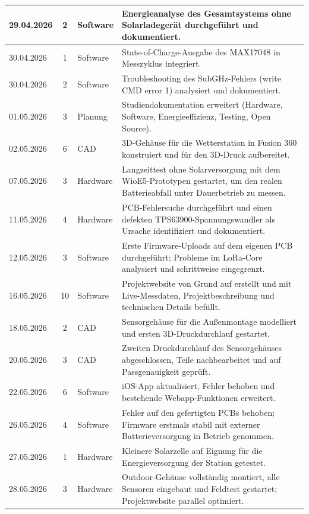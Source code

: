 \begin{longtable}{|l|c|l|p{7.5cm}|}
\hline
29.04.2026 & 2 & Software & Energieanalyse des Gesamtsystems ohne Solarladegerät durchgeführt und dokumentiert. \\
\hline
30.04.2026 & 1 & Software & State-of-Charge-Ausgabe des MAX17048 in Messzyklus integriert. \\
\hline
30.04.2026 & 2 & Software & Troubleshooting des SubGHz-Fehlers (write CMD error 1) analysiert und dokumentiert. \\
\hline
01.05.2026 & 3 & Planung & Studiendokumentation erweitert (Hardware, Software, Energieeffizienz, Testing, Open Source). \\
\hline
02.05.2026 & 6 & CAD & 3D-Gehäuse für die Wetterstation in Fusion 360 konstruiert und für den 3D-Druck aufbereitet. \\
\hline
07.05.2026 & 3 & Hardware & Langzeittest ohne Solarversorgung mit dem WioE5-Prototypen gestartet, um den realen Batterieabfall unter Dauerbetrieb zu messen. \\
\hline
11.05.2026 & 4 & Hardware & PCB-Fehlersuche durchgeführt und einen defekten TPS63900-Spannungswandler als Ursache identifiziert und dokumentiert. \\
\hline
12.05.2026 & 3 & Software & Erste Firmware-Uploads auf dem eigenen PCB durchgeführt; Probleme im LoRa-Core analysiert und schrittweise eingegrenzt. \\
\hline
16.05.2026 & 10 & Software & Projektwebsite von Grund auf erstellt und mit Live-Messdaten, Projektbeschreibung und technischen Details befüllt. \\
\hline
18.05.2026 & 2 & CAD & Sensorgehäuse für die Außenmontage modelliert und ersten 3D-Druckdurchlauf gestartet. \\
\hline
20.05.2026 & 3 & CAD & Zweiten Druckdurchlauf des Sensorgehäuses abgeschlossen, Teile nachbearbeitet und auf Passgenauigkeit geprüft. \\
\hline
22.05.2026 & 6 & Software & iOS-App aktualisiert, Fehler behoben und bestehende Webapp-Funktionen erweitert. \\
\hline
26.05.2026 & 4 & Software & Fehler auf den gefertigten PCBs behoben; Firmware erstmals stabil mit externer Batterieversorgung in Betrieb genommen. \\
\hline
27.05.2026 & 1 & Hardware & Kleinere Solarzelle auf Eignung für die Energieversorgung der Station getestet. \\
\hline
28.05.2026 & 3 & Hardware & Outdoor-Gehäuse vollständig montiert, alle Sensoren eingebaut und Feldtest gestartet; Projektwebsite parallel optimiert. \\

\end{longtable}
